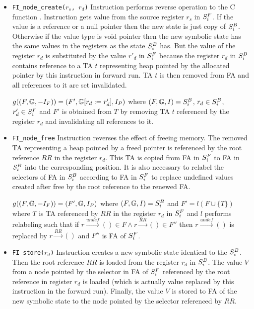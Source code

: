 \begin{itemize}
	\item {\tt FI\_node\_create($r_s$, $r_d$)}
		Instruction performs reverse operation to the C function .
		Instruction gets value from the source register $r_s$ in $S^{F}_{i}$.
		If the value is a reference or a null pointer then the new
		state is just copy of $S^{B}_{i}$.
		Otherwise if the value type is void pointer then the new symbolic
		state has the same values in the registers as the state $S^{B}_{i}$ has.
		But the value of the register $r_d$ is substituted by the value $r'_{d}$ in $S^{F}_{i}$
		because the register $r_d$ in $S^{B}_{i}$ contains reference to a TA $t$
		representing heap pointed by the allocated pointer by this instruction in forward run.
		TA $t$ is then removed from FA and all references to it are set invalidated.

		$g((F, \mathbb{G}, -I_{F})) = (F', \mathbb{G} [r_{d} := r'_{d}]
			, I_{P})$
			where $(F, \mathbb{G}, I) = S^{B}_{i}$,
			$r_{d} \in S^{B}_{i}$, $r'_{d} \in S^{F}_{i}$
			and $F'$ is obtained from $T$ by removing TA $t$ referenced by the register $r_d$
			and invalidating all references to it.

	\item {\tt FI\_node\_free}
		Instruction reverses the effect of freeing memory.
		The removed TA representing a heap pointed by a freed pointer
		is referenced by the root reference $RR$ in the register $r_d$.
		This TA is copied from FA in $S^{F}_{i}$ to FA in $S^{B}_{i}$ into the
		corresponding position.
		It is also necessary to relabel the selectors of FA in $S^{B}_{i}$
		according to FA in $S^{F}_{i}$ to replace undefined values created
		after free by the root reference to the renewed FA.

		$g((F, \mathbb{G}, -I_{F})) = (F', \mathbb{G}, I_{P})$
			where $(F, \mathbb{G}, I) = S^{B}_{i}$ and $F'= l(F \cup \{T\})$ where
			$T$ is TA referenced by $RR$ in the register $r_d$ in $S^{F}_{i}$
			and $l$ performs relabeling such that if $r \xrightarrow{undef} () \in F
			\wedge r \xrightarrow{RR} () \in F''$ then $r \xrightarrow{undef} ()$ is
			replaced by $r \xrightarrow{RR} ()$ and $F''$ is FA of $S^{F}_{i}$.

	\item {\tt FI\_store($r_d$)}
		Instruction creates a new symbolic state identical to the $S^{B}_{i}$.
		Then the root reference $RR$ is loaded from the register $r_d$ in $S^{B}_{i}$.
		The value $V$ from a node pointed by the selector in FA of $S^{F}_{i}$ referenced by
		the root reference in register $r_d$ is loaded (which is actually value replaced
		by this instruction in the forward run).
		Finally, the value $V$ is stored to FA of the new symbolic state to the node
		pointed by the selector referenced by $RR$.


\end{itemize}
